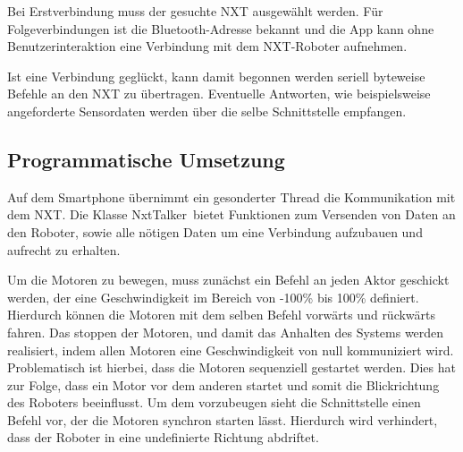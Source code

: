 Bei Erstverbindung muss der gesuchte NXT ausgewählt werden. Für Folgeverbindungen ist die Bluetooth-Adresse bekannt und die App kann ohne Benutzerinteraktion eine Verbindung mit dem NXT-Roboter aufnehmen.

Ist eine Verbindung geglückt, kann damit begonnen werden seriell byteweise Befehle an den NXT zu übertragen. Eventuelle Antworten, wie beispielsweise angeforderte Sensordaten werden über die selbe Schnittstelle empfangen.

\subsection{Programmatische Umsetzung}

Auf dem Smartphone übernimmt ein gesonderter Thread die Kommunikation mit dem NXT. Die Klasse \glqq NxtTalker\grqq\ bietet Funktionen zum Versenden von Daten an den Roboter, sowie alle nötigen Daten um eine Verbindung aufzubauen und aufrecht zu erhalten.

Um die Motoren zu bewegen, muss zunächst ein Befehl an jeden Aktor geschickt werden, der eine Geschwindigkeit im Bereich von -100\% bis 100\% definiert. Hierdurch können die Motoren mit dem selben Befehl vorwärts und rückwärts fahren. Das stoppen der Motoren, und damit das Anhalten des Systems werden realisiert, indem allen Motoren eine Geschwindigkeit von null kommuniziert wird. Problematisch ist hierbei, dass die Motoren sequenziell gestartet werden. Dies hat zur Folge, dass ein Motor vor dem anderen startet und somit die Blickrichtung des Roboters beeinflusst. Um dem vorzubeugen sieht die Schnittstelle einen Befehl vor, der die Motoren synchron starten lässt. Hierdurch wird verhindert, dass der Roboter in eine undefinierte Richtung abdriftet.
